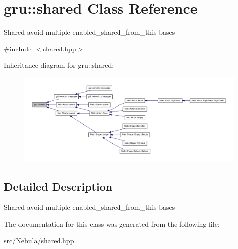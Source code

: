 \hypertarget{classgru_1_1shared}{\section{gru\-:\-:shared \-Class \-Reference}
\label{classgru_1_1shared}
}


\-Shared avoid multiple enabled\-\_\-shared\-\_\-from\-\_\-this bases  




{\ttfamily \#include $<$shared.\-hpp$>$}



\-Inheritance diagram for gru\-:\-:shared\-:\nopagebreak
\begin{figure}[H]
\begin{center}
\leavevmode
\includegraphics[width=350pt]{classgru_1_1shared__inherit__graph}
\end{center}
\end{figure}


\subsection{\-Detailed \-Description}
\-Shared avoid multiple enabled\-\_\-shared\-\_\-from\-\_\-this bases 

\-The documentation for this class was generated from the following file\-:\begin{DoxyCompactItemize}
\item 
src/\-Nebula/shared.\-hpp\end{DoxyCompactItemize}
